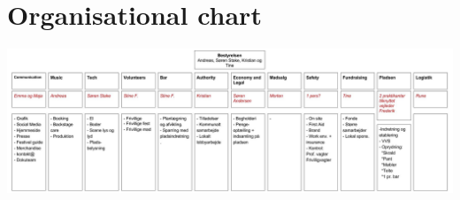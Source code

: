 \section{Organisational chart}
\label{org_chart}

\includegraphics[scale=0.35, angle=90]{Pictures/MIL_Organisational_chart-Ledelsen.jpg}